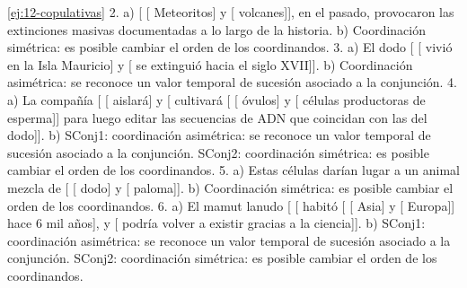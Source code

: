 \begin{solucion}{\ref{ej:12-copulativas}}
2. a) [ [ Meteoritos] y [
volcanes]], en el pasado, provocaron las extinciones masivas documentadas a lo
largo de la historia. b) Coordinación simétrica: es posible cambiar el orden de
los coordinandos. 3. a) El dodo [ [ vivió en la Isla
Mauricio] y [ se extinguió hacia el siglo XVII]]. b)
Coordinación asimétrica: se reconoce un valor temporal de sucesión asociado a la
conjunción. 4. a) La
compañía [ [ aislará] y [
cultivará [ [ óvulos] y [
células productoras de esperma]] para luego editar las secuencias de ADN que
coincidan con las del dodo]]. b) SConj1: coordinación asimétrica: se reconoce un
valor temporal de sucesión asociado a la conjunción. SConj2: coordinación
simétrica: es posible cambiar el orden de los coordinandos. 5. a) Estas células
darían lugar a un animal mezcla de [ [ dodo]
y [ paloma]]. b) Coordinación simétrica: es posible
cambiar el orden de los coordinandos. 6. a) El mamut lanudo [
[ habitó [ [ Asia] y
[ Europa]] hace 6 mil años], y [ podría
volver a existir gracias a la ciencia]]. b) SConj1: coordinación asimétrica: se
reconoce un valor temporal de sucesión asociado a la conjunción. SConj2:
coordinación simétrica: es posible cambiar el orden de los
coordinandos.
\end{solucion}

